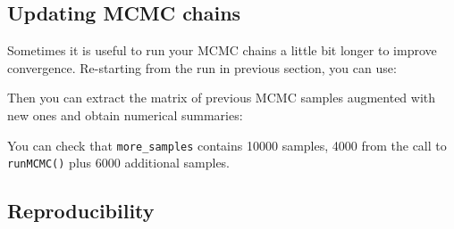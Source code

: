 \documentclass[
  12pt,
]{krantz}
\newenvironment{Shaded}{\begin{snugshade}}{\end{snugshade}}
\newcommand{\AttributeTok}[1]{\textcolor[rgb]{0.77,0.63,0.00}{#1}}
\newcommand{\ConstantTok}[1]{\textcolor[rgb]{0.00,0.00,0.00}{#1}}
\newcommand{\DecValTok}[1]{\textcolor[rgb]{0.00,0.00,0.81}{#1}}
\newcommand{\DocumentationTok}[1]{\textcolor[rgb]{0.56,0.35,0.01}{\textbf{\textit{#1}}}}
\newcommand{\FunctionTok}[1]{\textcolor[rgb]{0.00,0.00,0.00}{#1}}
\newcommand{\NormalTok}[1]{#1}
\newcommand{\OtherTok}[1]{\textcolor[rgb]{0.56,0.35,0.01}{#1}}
\newcommand{\SpecialCharTok}[1]{\textcolor[rgb]{0.00,0.00,0.00}{#1}}
\begin{document}
\hypertarget{updating-mcmc-chains}{%
\subsection{Updating MCMC chains}\label{updating-mcmc-chains}}

Sometimes it is useful to run your MCMC chains a little bit longer to improve convergence. Re-starting from the run in previous section, you can use:

\begin{Shaded}
\end{Shaded}

Then you can extract the matrix of previous MCMC samples augmented with new ones and obtain numerical summaries:

\begin{Shaded}
\end{Shaded}

You can check that \texttt{more\_samples} contains 10000 samples, 4000 from the call to \texttt{runMCMC()} plus 6000 additional samples.

\hypertarget{reproducibility}{%
\subsection{Reproducibility}\label{reproducibility}}
\end{document}
